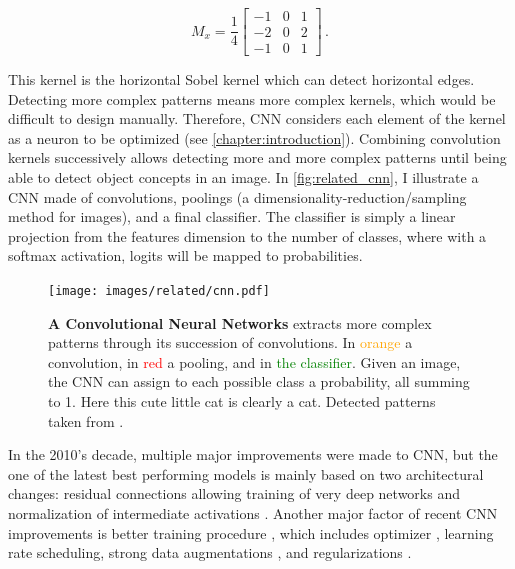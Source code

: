 \begin{equation}
      M_{x}=\frac{1}{4}\left[\begin{array}{lll}
                  -1 & 0 & 1 \\
                  -2 & 0 & 2 \\
                  -1 & 0 & 1
            \end{array}\right]\,.
      \label{eq:sobel_horizontal}
\end{equation}

This kernel is the horizontal Sobel kernel which can detect horizontal edges. Detecting more complex
patterns means more complex kernels, which would be difficult to design manually. Therefore,
\acs{CNN} considers each element of the kernel as a neuron to be optimized (see
\autoref{chapter:introduction}). Combining convolution kernels successively allows detecting
more and more complex patterns until being able to detect object concepts in an image. In
\autoref{fig:related_cnn}, I illustrate a \ac{CNN} made of convolutions, poolings (a
dimensionality-reduction/sampling method for images), and a final classifier. The classifier is simply
a linear projection from the features dimension to the number of classes, where with a softmax
activation, logits will be mapped to probabilities.


\begin{figure}[tb]
      \begin{center}
            \texttt{[image: images/related/cnn.pdf]}
      \end{center}
      \caption{\textbf{A Convolutional Neural Networks} extracts more complex patterns through its
            succession of convolutions. In \textcolor{orange}{orange} a convolution, in \textcolor{red}{red}
            a pooling, and in \textcolor{green}{the classifier}. Given an image, the \ac{CNN} can assign to
            each possible class a probability, all summing to 1. Here this cute little cat is clearly a cat.
            Detected patterns taken from \cite{olah2017feature}.}
      \label{fig:related_cnn}
\end{figure}


In the 2010's decade, multiple major improvements were made to \acs{CNN}, but the one of
the latest best performing models \citep{tan2019efficientnet} is mainly based on two architectural changes:
residual connections allowing training of very deep networks \citep{he2016resnet} and normalization
of intermediate activations \citep{ioffe2015batchnorm}. Another major factor of recent \ac{CNN}
improvements is better training procedure \citep{wightman2019resnetstrikesback}, which includes
optimizer \citep{kingma2014adam}, learning rate scheduling, strong data augmentations
\citep{muller2021trivialaugment,hingyi2018mixup,zhong2017erasing}, and regularizations
\citep{gal2016dropout,gao2016stochasticdepth}.


